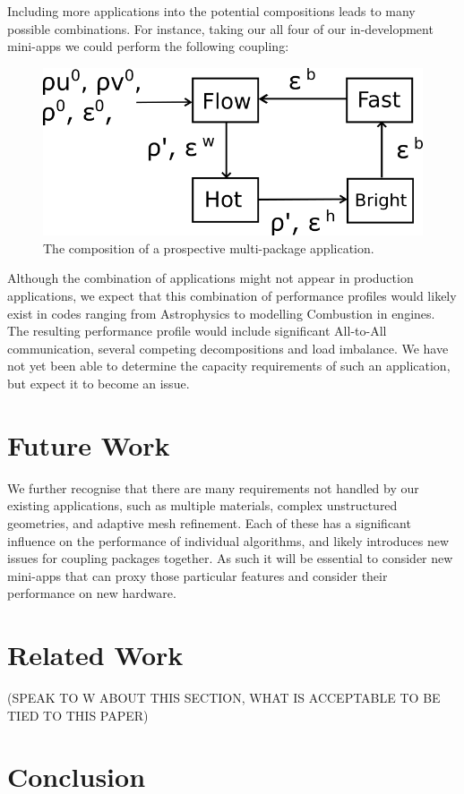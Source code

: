 \documentclass[runningheads,a4paper]{llncs}
\begin{document}
Including more applications into the potential compositions leads to many possible combinations. For instance, taking our all four of our in-development mini-apps we could perform the following coupling:

\begin{figure}
  \centering
  \includegraphics[width=0.6\linewidth]{all-four-flow}
  \caption{The composition of a prospective multi-package application.}
  \label{fig:multi-package-flow}
\end{figure}

Although the combination of applications might not appear in production applications, we expect that this combination of performance profiles would likely exist in codes ranging from Astrophysics to modelling Combustion in engines. The resulting performance profile would include significant All-to-All communication, several competing decompositions and load imbalance. We have not yet been able to determine the capacity requirements of such an application, but expect it to become an issue.

\section{Future Work}

We further recognise that there are many requirements not handled by our existing applications, such as multiple materials, complex unstructured geometries, and adaptive mesh refinement. Each of these has a significant influence on the performance of individual algorithms, and likely introduces new issues for coupling packages together. As such it will be essential to consider new mini-apps that can proxy those particular features and consider their performance on new hardware.

\section{Related Work}

(SPEAK TO W ABOUT THIS SECTION, WHAT IS ACCEPTABLE TO BE TIED TO THIS PAPER)

\section{Conclusion}
\end{document}

